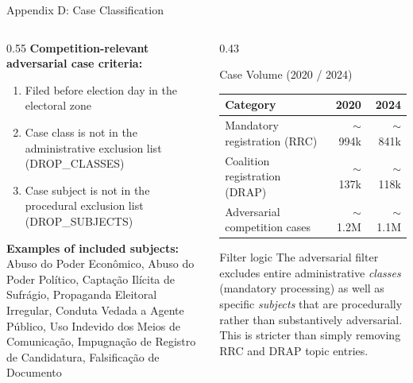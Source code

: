 \documentclass[aspectratio=169,10pt]{beamer}
\begin{document}
\begin{frame}{Appendix D: Case Classification}
\begin{columns}[T]
\begin{column}{0.55\textwidth}
\textbf{Competition-relevant adversarial case criteria:}
\begin{enumerate}
  \item Filed before election day in the electoral zone
  \item Case class is not in the administrative exclusion list (DROP\_CLASSES)
  \item Case subject is not in the procedural exclusion list (DROP\_SUBJECTS)
\end{enumerate}
\bigskip
\textbf{Examples of included subjects:}\\
\footnotesize
Abuso do Poder Econ\^{o}mico, Abuso do Poder Pol\'{i}tico, Capta\c{c}\~{a}o Il\'{i}cita de Sufr\'{a}gio, Propagan\-da Elei\-to\-ral Ir\-re\-gu\-lar, Con\-du\-ta Ve\-da\-da a Agen\-te P\'{u}b\-li\-co, Uso In\-de\-vi\-do dos Meios de Co\-mu\-nica\-\c{c}\~{a}o, Im\-pug\-na\-\c{c}\~{a}o de Re\-gis\-tro de Can\-di\-da\-tu\-ra, Fal\-si\-fi\-ca\-\c{c}\~{a}o de Do\-cu\-men\-to
\end{column}
\begin{column}{0.43\textwidth}
\begin{block}{Case Volume (2020 / 2024)}
  \footnotesize
\renewcommand{\arraystretch}{1.2}
\begin{tabular}{lrr}
  \toprule
  Category & 2020 & 2024 \\
  \midrule
  Mandatory registration (RRC) & $\sim$994k & $\sim$841k \\
  Coalition registration (DRAP) & $\sim$137k & $\sim$118k \\
  Adversarial competition cases & $\sim$1.2M & $\sim$1.1M \\
  \bottomrule
\end{tabular}
\end{block}
\medskip
\begin{alertblock}{Filter logic}
\footnotesize The adversarial filter excludes entire administrative \emph{classes} (mandatory processing) as well as specific \emph{subjects} that are procedurally rather than substantively adversarial. This is stricter than simply removing RRC and DRAP topic entries.
\end{alertblock}
\end{column}
\end{columns}
\end{frame}
\end{document}

